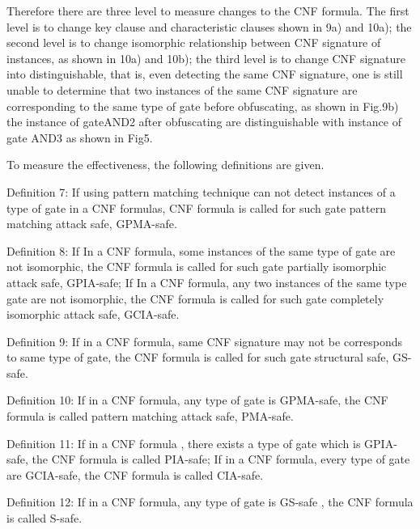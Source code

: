 \documentclass[runningheads,a4paper]{llncs}
\begin{document}
Therefore there are three level to measure changes to the CNF formula. The first level is to change key clause and characteristic clauses shown in 9a) and 10a); the second level is to change isomorphic relationship between CNF signature of instances, as shown in 10a) and 10b); the third level is to change CNF signature into distinguishable, that is, even detecting the same CNF signature, one is still unable to determine that two instances of the same CNF signature are corresponding to the same type of gate before obfuscating, as shown in Fig.9b) the instance of gateAND2 after obfuscating are distinguishable with instance of gate AND3 as shown in Fig5.

To measure the effectiveness, the following definitions are given.

\noindent \newline Definition 7: If using pattern matching technique can not detect instances of a type of gate in a CNF formulas, CNF formula is called for such gate pattern matching attack safe, GPMA-safe.

\noindent \newline Definition 8: If In a CNF formula, some instances of the same type of gate are not isomorphic, the CNF formula is called for such gate partially isomorphic attack safe, GPIA-safe; If In a CNF formula, any two instances of the same type gate are not isomorphic, the CNF formula is called for such gate completely isomorphic attack safe, GCIA-safe.

\noindent \newline Definition 9: If in a CNF formula, same CNF signature may not be corresponds to same type of gate, the CNF formula is called for such gate structural safe, GS-safe.

\noindent \newline Definition 10: If in a CNF formula, any type of gate is GPMA-safe, the CNF formula is called pattern matching attack safe, PMA-safe.

\noindent \newline Definition 11: If in a CNF formula , there exists a type of gate which is GPIA-safe, the CNF formula is called PIA-safe; If in a CNF formula, every type of gate are GCIA-safe, the CNF formula is called CIA-safe.

\noindent \newline Definition 12: If in a CNF formula, any type of gate is GS-safe , the CNF formula is called S-safe. \noindent \newline {}  
\end{document}
